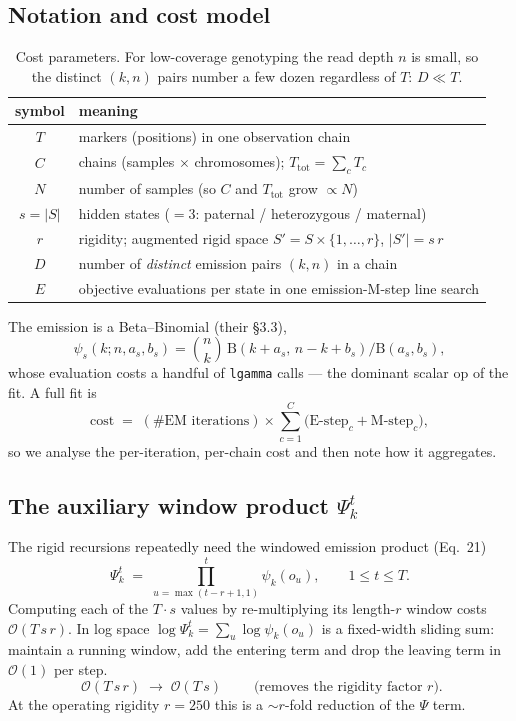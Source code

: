 \documentclass[11pt]{article}
\newcommand{\code}[1]{\texttt{#1}}
\newcommand{\bigO}{\mathcal{O}}
\newcommand{\states}{\lvert S\rvert}
\begin{document}
\subsection{Notation and cost model}
\begin{table}[htbp]
\centering
\small
\begin{tabular}{@{}c l@{}}
\toprule
symbol & meaning \\
\midrule
$T$        & markers (positions) in one observation chain \\
$C$        & chains (samples $\times$ chromosomes); $T_{\text{tot}}=\sum_c T_c$ \\
$N$        & number of samples (so $C$ and $T_{\text{tot}}$ grow $\propto N$) \\
$s=\states$ & hidden states ($=3$: paternal / heterozygous / maternal) \\
$r$        & rigidity; augmented rigid space $S'=S\times\{1,\dots,r\}$, $\lvert S'\rvert=s\,r$ \\
$D$        & number of \emph{distinct} emission pairs $(k,n)$ in a chain \\
$E$        & objective evaluations per state in one emission-M-step line search \\
\bottomrule
\end{tabular}
\caption{Cost parameters. For low-coverage genotyping the read depth $n$ is small,
so the distinct $(k,n)$ pairs number a few dozen regardless of $T$: $D\ll T$.}
\label{tab:cost-symbols}
\end{table}

The emission is a Beta--Binomial (their \S3.3),
\[
\psi_s(k;n,a_s,b_s)=\binom{n}{k}\,\mathrm{B}(k+a_s,\,n-k+b_s)/\mathrm{B}(a_s,b_s),
\]
whose evaluation costs a handful of \code{lgamma} calls --- the dominant scalar op of
the fit. A full fit is
\[
\text{cost} \;=\; (\#\text{EM iterations})\times\sum_{c=1}^{C}\big(\text{E-step}_c + \text{M-step}_c\big),
\]
so we analyse the per-iteration, per-chain cost and then note how it aggregates.

\subsection{The auxiliary window product \texorpdfstring{$\Psi^t_k$}{Psi}}
The rigid recursions repeatedly need the windowed emission product (Eq.~21)
\begin{equation}
\Psi^{t}_k \;=\; \prod_{u=\max(t-r+1,1)}^{t}\psi_k(o_u),
\qquad 1\le t\le T .
\tag{21}
\end{equation}
Computing each of the $T\cdot s$ values by re-multiplying its length-$r$ window costs
$\bigO(T\,s\,r)$. In log space $\log\Psi^t_k=\sum_{u}\log\psi_k(o_u)$ is a fixed-width
sliding sum: maintain a running window, add the entering term and drop the leaving
term in $\bigO(1)$ per step.
\[
\boxed{\;\bigO(T\,s\,r)\;\longrightarrow\;\bigO(T\,s)\;}
\qquad\text{(removes the rigidity factor }r\text{).}
\]
At the operating rigidity $r=250$ this is a $\sim r$-fold reduction of the $\Psi$
term.
\end{document}
